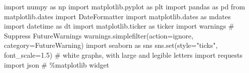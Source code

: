 \documentclass[
  letterpaper,
  DIV=11,
  numbers=noendperiod,
  oneside]{scrreprt}
\newenvironment{Shaded}{\begin{snugshade}}{\end{snugshade}}
\newcommand{\BuiltInTok}[1]{\textcolor[rgb]{0.00,0.23,0.31}{#1}}
\newcommand{\CommentTok}[1]{\textcolor[rgb]{0.37,0.37,0.37}{#1}}
\newcommand{\FloatTok}[1]{\textcolor[rgb]{0.68,0.00,0.00}{#1}}
\newcommand{\ImportTok}[1]{\textcolor[rgb]{0.00,0.46,0.62}{#1}}
\newcommand{\NormalTok}[1]{\textcolor[rgb]{0.00,0.23,0.31}{#1}}
\newcommand{\OperatorTok}[1]{\textcolor[rgb]{0.37,0.37,0.37}{#1}}
\newcommand{\PreprocessorTok}[1]{\textcolor[rgb]{0.68,0.00,0.00}{#1}}
\newcommand{\StringTok}[1]{\textcolor[rgb]{0.13,0.47,0.30}{#1}}
\begin{document}
\begin{Shaded}
\begin{Highlighting}[]
\ImportTok{import}\NormalTok{ numpy }\ImportTok{as}\NormalTok{ np}
\ImportTok{import}\NormalTok{ matplotlib.pyplot }\ImportTok{as}\NormalTok{ plt}
\ImportTok{import}\NormalTok{ pandas }\ImportTok{as}\NormalTok{ pd}
\ImportTok{from}\NormalTok{ matplotlib.dates }\ImportTok{import}\NormalTok{ DateFormatter}
\ImportTok{import}\NormalTok{ matplotlib.dates }\ImportTok{as}\NormalTok{ mdates}
\ImportTok{import}\NormalTok{ datetime }\ImportTok{as}\NormalTok{ dt}
\ImportTok{import}\NormalTok{ matplotlib.ticker }\ImportTok{as}\NormalTok{ ticker}
\ImportTok{import}\NormalTok{ warnings}
\CommentTok{\# Suppress FutureWarnings}
\NormalTok{warnings.simplefilter(action}\OperatorTok{=}\StringTok{\textquotesingle{}ignore\textquotesingle{}}\NormalTok{, category}\OperatorTok{=}\PreprocessorTok{FutureWarning}\NormalTok{)}
\ImportTok{import}\NormalTok{ seaborn }\ImportTok{as}\NormalTok{ sns}
\NormalTok{sns.}\BuiltInTok{set}\NormalTok{(style}\OperatorTok{=}\StringTok{"ticks"}\NormalTok{, font\_scale}\OperatorTok{=}\FloatTok{1.5}\NormalTok{)  }\CommentTok{\# white graphs, with large and legible letters}
\ImportTok{import}\NormalTok{ requests}
\ImportTok{import}\NormalTok{ json}
\CommentTok{\# \%matplotlib widget}
\end{Highlighting}
\end{Shaded}
\end{document}
